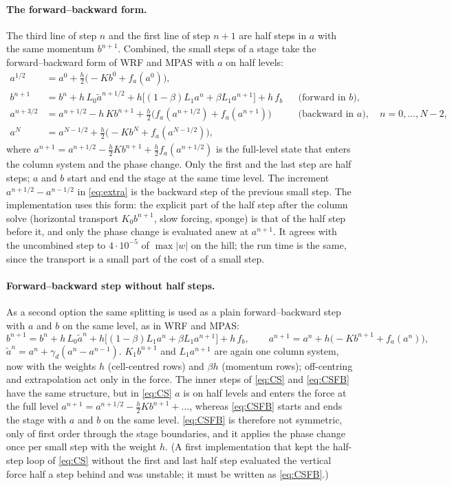 \documentclass[11pt,a4paper]{article}
\begin{document}
\paragraph{The forward--backward form.} The third line of step $n$ and the first line of step $n+1$ are half
steps in $a$ with the same momentum $b^{n+1}$. Combined, the small steps of a stage take the forward--backward form
of WRF and MPAS \cite{ksd,wrf} with $a$ on half levels:
\begin{align*}
a^{1/2}&=a^0+\tfrac h2\big(-Kb^0+f_a(a^0)\big),\\
b^{n+1}&=b^n+h\,L_0\tilde a^{n+1/2}+h\big[(1-\beta)L_1a^n+\beta L_1a^{n+1}\big]+h\,f_b&&\text{(forward in $b$)},\\
a^{n+3/2}&=a^{n+1/2}-h\,Kb^{n+1}+\tfrac h2\big(f_a(a^{n+1/2})+f_a(a^{n+1})\big)&&\text{(backward in $a$)},\quad n=0,\dots,N-2,\\
a^N&=a^{N-1/2}+\tfrac h2\big(-Kb^N+f_a(a^{N-1/2})\big),
\end{align*}
where $a^{n+1}=a^{n+1/2}-\tfrac h2Kb^{n+1}+\tfrac h2f_a(a^{n+1/2})$ is the full-level state that enters the column system and the
phase change. Only the first and the last step are half steps; $a$ and $b$ start and end the stage at the same
time level. The increment $a^{n+1/2}-a^{n-1/2}$ in \eqref{eq:extra} is the backward step of the previous small step.
The implementation uses this form: the explicit part of the half step after the column solve (horizontal transport
$K_0b^{n+1}$, slow forcing, sponge) is that of the half step before it, and only the phase change is evaluated anew at
$a^{n+1}$. It agrees with the uncombined step to $4\cdot10^{-5}$ of $\max|w|$ on the hill; the run time is the same, since the
transport is a small part of the cost of a small step.

\paragraph{Forward--backward step without half steps.} As a second option the same splitting is used as a plain
forward--backward step with $a$ and $b$ on the same level, as in WRF and MPAS:
\begin{equation}
b^{n+1}=b^n+h\,L_0\tilde a^n+h\big[(1-\beta)L_1a^n+\beta L_1a^{n+1}\big]+h\,f_b,\qquad
a^{n+1}=a^n+h\big(-Kb^{n+1}+f_a(a^n)\big),\label{eq:CSFB}
\end{equation}
$\tilde a^n=a^n+\gamma_d(a^n-a^{n-1})$. $K_1b^{n+1}$ and $L_1a^{n+1}$ are again one column system, now with the weights $h$ (cell-centred
rows) and $\beta h$ (momentum rows); off-centring and extrapolation act only in the force. The inner steps of \eqref{eq:CS} and
\eqref{eq:CSFB} have the same structure, but in \eqref{eq:CS} $a$ is on half levels and enters the force at the full level
$a^{n+1}=a^{n+1/2}-\tfrac h2Kb^{n+1}+\dots$, whereas \eqref{eq:CSFB} starts and ends the stage with $a$ and $b$ on the same
level. \eqref{eq:CSFB} is therefore not symmetric, only of first order through the stage boundaries, and it applies the
phase change once per small step with the weight $h$. (A first implementation that kept the half-step loop of \eqref{eq:CS}
without the first and last half step evaluated the vertical force half a step behind and was unstable; it must be
written as \eqref{eq:CSFB}.)
\end{document}
